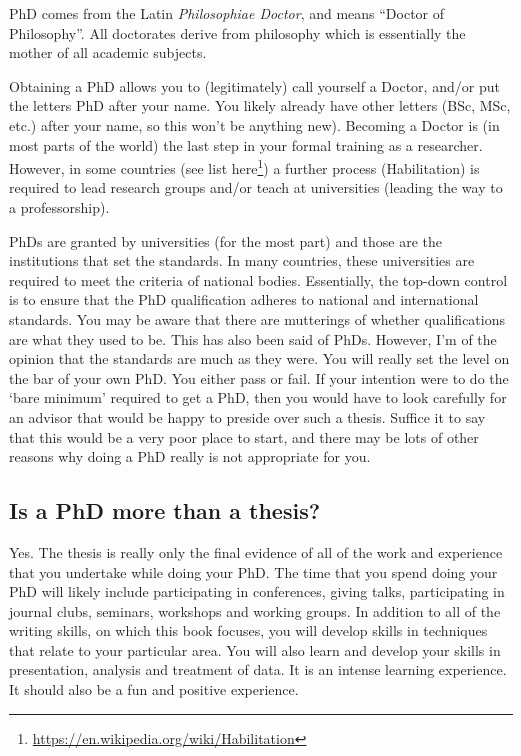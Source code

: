 \documentclass[
]{krantz}
\renewcommand{\href}[2]{#2\footnote{\url{#1}}}
\begin{document}
PhD comes from the Latin \emph{Philosophiae Doctor}, and means ``Doctor of Philosophy''. All doctorates derive from philosophy which is essentially the mother of all academic subjects.

Obtaining a PhD allows you to (legitimately) call yourself a Doctor, and/or put the letters PhD after your name. You likely already have other letters (BSc, MSc, etc.) after your name, so this won't be anything new). Becoming a Doctor is (in most parts of the world) the last step in your formal training as a researcher. However, in some countries (see list \href{https://en.wikipedia.org/wiki/Habilitation}{here}) a further process (Habilitation) is required to lead research groups and/or teach at universities (leading the way to a professorship).

PhDs are granted by universities (for the most part) and those are the institutions that set the standards. In many countries, these universities are required to meet the criteria of national bodies. Essentially, the top-down control is to ensure that the PhD qualification adheres to national and international standards. You may be aware that there are mutterings of whether qualifications are what they used to be. This has also been said of PhDs. However, I'm of the opinion that the standards are much as they were. You will really set the level on the bar of your own PhD. You either pass or fail. If your intention were to do the `bare minimum' required to get a PhD, then you would have to look carefully for an advisor that would be happy to preside over such a thesis. Suffice it to say that this would be a very poor place to start, and there may be lots of other reasons why doing a PhD really is not appropriate for you.

\hypertarget{is-a-phd-more-than-a-thesis}{%
\subsection{Is a PhD more than a thesis?}\label{is-a-phd-more-than-a-thesis}}

Yes. The thesis is really only the final evidence of all of the work and experience that you undertake while doing your PhD. The time that you spend doing your PhD will likely include participating in conferences, giving talks, participating in journal clubs, seminars, workshops and working groups. In addition to all of the writing skills, on which this book focuses, you will develop skills in techniques that relate to your particular area. You will also learn and develop your skills in presentation, analysis and treatment of data. It is an intense learning experience. It should also be a fun and positive experience.
\end{document}
